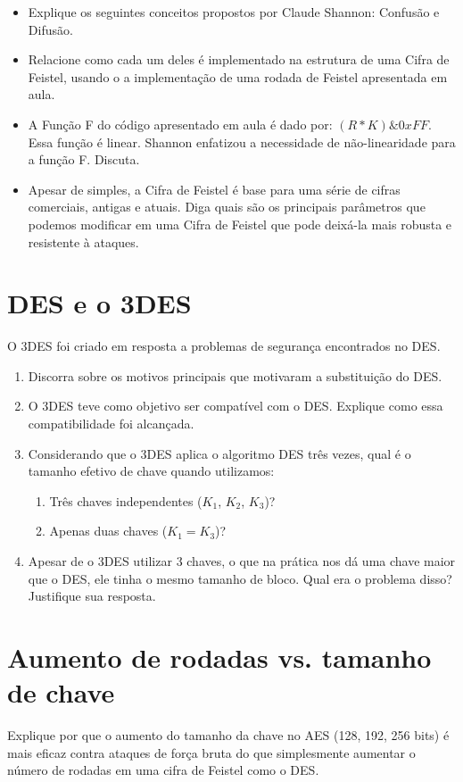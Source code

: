 \begin{itemize}
    \item Explique os seguintes conceitos propostos por Claude Shannon: Confusão e Difusão.
    \item Relacione como cada um deles é implementado na estrutura de uma Cifra de Feistel, usando o a implementação de uma rodada de Feistel apresentada em aula.
    \item A Função F do código apresentado em aula é dado por: $(R * K) \& 0xFF$. Essa função é linear. Shannon enfatizou a necessidade de não-linearidade para a função F. Discuta.
    \item Apesar de simples, a Cifra de Feistel é base para uma série de cifras comerciais, antigas e atuais. Diga quais são os principais parâmetros que podemos modificar em uma Cifra de Feistel que pode deixá-la mais robusta e resistente à ataques.
\end{itemize}

\section{DES e o 3DES}

O 3DES foi criado em resposta a problemas de segurança encontrados no DES.
\begin{enumerate}
    \item Discorra sobre os motivos principais que motivaram a substituição do DES.
    \item O 3DES teve como objetivo ser compatível com o DES. Explique como essa compatibilidade foi alcançada.
    \item Considerando que o 3DES aplica o algoritmo DES três vezes, qual é o tamanho efetivo de chave quando utilizamos:
          \begin{enumerate}
              \item Três chaves independentes ($K_1$, $K_2$, $K_3$)?
              \item Apenas duas chaves ($K_1 = K_3$)?
          \end{enumerate}
    \item Apesar de o 3DES utilizar 3 chaves, o que na prática nos dá uma chave maior que o DES, ele tinha o mesmo tamanho de bloco. Qual era o problema disso?
          Justifique sua resposta.
\end{enumerate}

\section{Aumento de rodadas vs. tamanho de chave}
Explique por que o aumento do tamanho da chave no AES (128, 192, 256 bits) é mais eficaz contra ataques de força bruta do que simplesmente aumentar o número de rodadas em uma cifra de Feistel como o DES.

